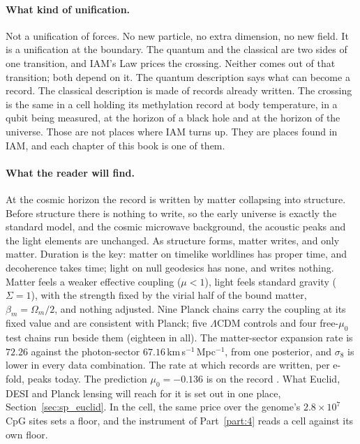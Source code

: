 \paragraph{What kind of unification.} Not a unification of forces. No new particle, no extra dimension, no new field. It is a unification at the
boundary. The quantum and the classical are two sides of one transition, and IAM's Law prices the crossing. Neither comes out of that transition;
both depend on it. The quantum description says what can become a record. The classical description is made of records already written. The
crossing is the same in a cell holding its methylation record at body temperature, in a qubit being measured, at the horizon of a black hole and at
the horizon of the universe. Those are not places where IAM turns up. They are places found in IAM, and each chapter of this book is one of them.

\paragraph{What the reader will find.} At the cosmic horizon the record is written by matter collapsing into structure. Before structure there is
nothing to write, so the early universe is exactly the standard model, and the cosmic microwave background, the acoustic peaks and the light
elements are unchanged. As structure forms, matter writes, and only matter. Duration is the key: matter on timelike worldlines has proper time, and decoherence takes time; light on null geodesics has none, and writes nothing. Matter feels a weaker
effective coupling ($\mu<1$), light feels standard gravity ($\Sigma=1$), with the strength fixed by the virial half of the bound matter,
$\beta_m=\Omega_m/2$, and nothing adjusted. Nine Planck chains carry the coupling at its fixed value and are consistent with Planck; five $\Lambda$CDM controls and four free-$\mu_0$ test chains run beside them (eighteen in all). The matter-sector expansion rate is $72.26$ against the
photon-sector $67.16$\,km\,s$^{-1}$\,Mpc$^{-1}$, from one posterior, and $\sigma_8$ is lower in every data combination. The rate at which records
are written, per e-fold, peaks today. The prediction $\mu_0=-0.136$ is on the record \prediction. What Euclid, DESI and Planck lensing will reach for it is set out in one place,
Section~\ref{sec:sp_euclid}. In the cell, the same price over the genome's $2.8\times10^7$ CpG sites sets a floor, and the instrument of
Part~\ref{part:4} reads a cell against its own floor.
